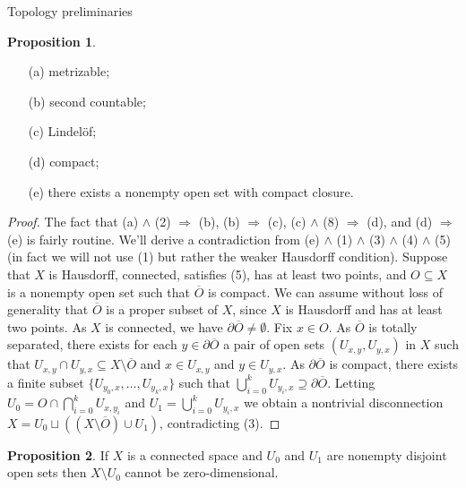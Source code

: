 \documentclass{amsart}
\theoremstyle{definition}\newtheorem{theorem}{Theorem}
\theoremstyle{definition}\newtheorem{bigtheorem}{Theorem}
\numberwithin{theorem}{section}
\theoremstyle{definition}\newtheorem{corollary}[theorem]{Corollary}
\theoremstyle{definition}\newtheorem{proposition}[theorem]{Proposition}
\theoremstyle{definition}\newtheorem{definition}[theorem]{Definition}
\theoremstyle{definition}\newtheorem{question}[theorem]{Question}
\theoremstyle{definition}\newtheorem{example}[theorem]{Example}
\theoremstyle{definition}\newtheorem{remark}[theorem]{Remark}
\theoremstyle{definition}\newtheorem{note}[theorem]{Note}
\theoremstyle{definition}\newtheorem{lemma}[theorem]{Lemma}
\theoremstyle{definition}\newtheorem{fact}[theorem]{Fact}
\theoremstyle{definition}\newtheorem{define}[theorem]{Definition}
\theoremstyle{definition}\newtheorem{definitions}[theorem]{Definitions}
\theoremstyle{definition}\newtheorem{claim}[theorem]{Claim}
\theoremstyle{definition}\newtheorem{obs}[theorem]{Observation}
\theoremstyle{definition}\newtheorem{construction}[theorem]{Construction}
\begin{document}
\begin{section}{Topology preliminaries}
\begin{proposition}
\begin{enumerate}

\item[(a)] metrizable;

\item[(b)] second countable;

\item[(c)] Lindel\"of;

\item[(d)] compact;

\item[(e)] there exists a nonempty open set with compact closure.
\end{enumerate}
\end{proposition}

\begin{proof}  The fact that (a) $\wedge$ (2) $\Rightarrow$ (b), (b) $\Rightarrow$ (c), (c) $\wedge$ (8) $\Rightarrow$ (d), and (d) $\Rightarrow$ (e) is fairly routine.  We'll derive a contradiction from (e) $\wedge$ (1) $\wedge$ (3) $\wedge$ (4) $\wedge$ (5) (in fact we will not use (1) but rather the weaker Hausdorff condition).  Suppose that $X$ is Hausdorff, connected, satisfies (5), has at least two points, and $O \subseteq X$ is a nonempty open set such that $\overline{O}$ is compact.  We can assume without loss of generality that $\overline{O}$ is a proper subset of $X$, since $X$ is Hausdorff and has at least two points.  As $X$ is connected, we have $\partial \overline{O} \neq \emptyset$.  Fix $x\in O$.  As $\overline{O}$ is totally separated, there exists for each $y\in \partial \overline{O}$ a pair of open sets $(U_{x, y}, U_{y, x})$ in $X$ such that $U_{x, y} \cap U_{y, x} \subseteq X \setminus \overline{O}$ and $x\in U_{x, y}$ and $y\in U_{y, x}$.  As $\partial \overline{O}$ is compact, there exists a finite subset $\{U_{y_0, x}, \ldots, U_{y_k, x}\}$ such that $\bigcup_{i = 0}^{k} U_{y_i, x} \supseteq \partial \overline{O}$.  Letting $U_0 = O \cap \bigcap_{i = 0}^k U_{x, y_i}$ and $U_1 = \bigcup_{i = 0}^k U_{y_i, x}$ we obtain a nontrivial disconnection $X = U_0 \sqcup ((X \setminus \overline{O}) \cup U_1)$, contradicting (3).
\end{proof}

\begin{proposition}\label{notzerodim}  If $X$ is a connected space and $U_0$ and $U_1$ are nonempty disjoint open sets  then $X \setminus U_0$ cannot be zero-dimensional.
\end{proposition}


\end{section}
\end{document}
